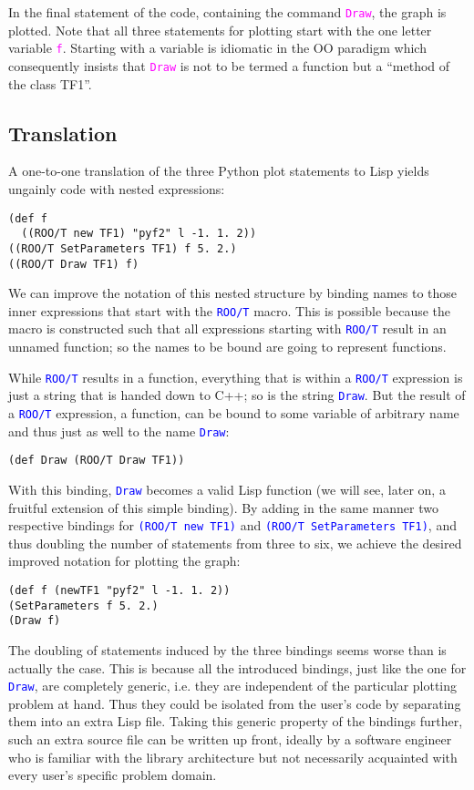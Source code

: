\documentclass{IEEEcsmag}
\begin{document}
In the final statement of the code, containing the command \texttt{\textcolor{magenta}{Draw}}, the graph is plotted. Note that all three statements for plotting start with the one letter variable \texttt{\textcolor{magenta}{f}}. Starting with a variable is idiomatic in the OO paradigm which consequently insists that \texttt{\textcolor{magenta}{Draw}} is not to be termed a function but a “method of the class TF1”.\vspace*{-5pt}

\subsection{Translation}
A one-to-one translation of the three Python plot statements to Lisp yields ungainly code with nested expressions:
{\color{blue}\begin{verbatim}
(def f 
  ((ROO/T new TF1) "pyf2" l -1. 1. 2))
((ROO/T SetParameters TF1) f 5. 2.)
((ROO/T Draw TF1) f)
\end{verbatim}}
We can improve the notation of this nested structure by binding names to those inner expressions that start with the \texttt{\textcolor{blue}{ROO/T}} macro. This is possible because the macro is constructed such that all expressions starting with \texttt{\textcolor{blue}{ROO/T}} result in an unnamed function; so the names to be bound are going to represent functions.

While \texttt{\textcolor{blue}{ROO/T}} results in a function, everything that is within a \texttt{\textcolor{blue}{ROO/T}} expression is just a string that is handed down to C++; so is the string \texttt{\textcolor{blue}{Draw}}. But the result of a \texttt{\textcolor{blue}{ROO/T}} expression, a function, can be bound to some variable of arbitrary name and thus just as well to the name \texttt{\textcolor{blue}{Draw}}:
{\color{blue}\begin{verbatim}
(def Draw (ROO/T Draw TF1))
\end{verbatim}}
With this binding, \texttt{\textcolor{blue}{Draw}} becomes a valid Lisp function (we will see, later on, a fruitful extension of this simple binding). By adding in the same manner two respective bindings for \texttt{\textcolor{blue}{(ROO/T new TF1)}} and \texttt{\textcolor{blue}{(ROO/T SetParameters TF1)}}, and thus doubling the number of statements from three to six, we achieve the desired improved notation for plotting the graph:
{\color{blue}\begin{verbatim}
(def f (newTF1 "pyf2" l -1. 1. 2))
(SetParameters f 5. 2.)
(Draw f)
\end{verbatim}}
The doubling of statements induced by the three bindings seems worse than is actually the case. This is because all the introduced bindings, just like the one for \texttt{\textcolor{blue}{Draw}}, are completely generic, i.e. they are independent of the particular plotting problem at hand. Thus they could be isolated from the user’s code by separating them into an extra Lisp file. Taking this generic property of the bindings further, such an extra source file can be written up front, ideally by a software engineer who is familiar with the library architecture but not necessarily acquainted with every user’s specific problem domain.\vspace*{-5pt}
\end{document}
